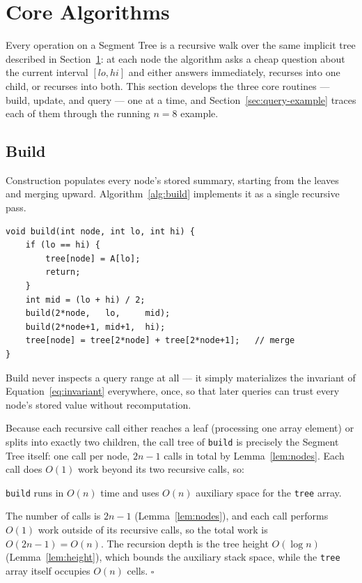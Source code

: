 \documentclass[
  11pt,
  a4paper,
  twoside=false,
  numbers=noenddot,
  headings=big,
  parskip=half,
  toc=bibliography,
  toc=listof,
  bibliography=totoc
]{scrreprt}
\newcounter{example}[chapter]
\newenvironment{proof}[1][Proof]{\par\noindent{\bfseries\sffamily\color{navy}#1.}\enspace}{\hfill$\square$\par\medskip}
\newcommand{\Oh}[1]{O\!\left(#1\right)}
\begin{document}
\section{Core Algorithms}
\label{sec:core-algorithms}
Every operation on a Segment Tree is a recursive walk over the same implicit tree described in Section~\ref{sec:core-algorithms}: at each node the algorithm asks a cheap question about the current interval $[lo,hi]$ and either answers immediately, recurses into one child, or recurses into both. This section develops the three core routines --- build, update, and query --- one at a time, and Section~\ref{sec:query-example} traces each of them through the running $n=8$ example.

\subsection{Build}
\label{sec:build}
Construction populates every node's stored summary, starting from the leaves and merging upward. Algorithm~\ref{alg:build} implements it as a single recursive pass.

\begin{lstlisting}[style=cpp, caption={Recursive build.}, label={alg:build}]
void build(int node, int lo, int hi) {
    if (lo == hi) {
        tree[node] = A[lo];
        return;
    }
    int mid = (lo + hi) / 2;
    build(2*node,   lo,     mid);
    build(2*node+1, mid+1,  hi);
    tree[node] = tree[2*node] + tree[2*node+1];   // merge
}
\end{lstlisting}

\begin{keyidea}
Build never inspects a query range at all --- it simply materializes the invariant of Equation~\eqref{eq:invariant} everywhere, once, so that later queries can trust every node's stored value without recomputation.
\end{keyidea}

Because each recursive call either reaches a leaf (processing one array element) or splits into exactly two children, the call tree of \texttt{build} is precisely the Segment Tree itself: one call per node, $2n-1$ calls in total by Lemma~\ref{lem:nodes}. Each call does $O(1)$ work beyond its two recursive calls, so:

\begin{lem}\label{lem:build-time}
\texttt{build} runs in $\Oh{n}$ time and uses $\Oh{n}$ auxiliary space for the \texttt{tree} array.
\end{lem}
\begin{proof}
The number of calls is $2n-1$ (Lemma~\ref{lem:nodes}), and each call performs $O(1)$ work outside of its recursive calls, so the total work is $\Oh{2n-1}=\Oh{n}$. The recursion depth is the tree height $\Oh{\log n}$ (Lemma~\ref{lem:height}), which bounds the auxiliary stack space, while the \texttt{tree} array itself occupies $\Oh{n}$ cells.
\end{proof}
\end{document}
